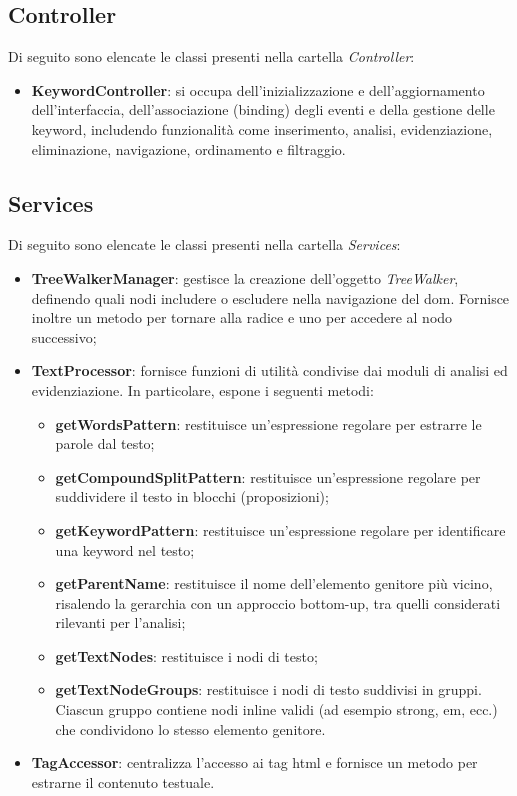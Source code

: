 \subsection{Controller}

\par Di seguito sono elencate le classi presenti nella cartella \textit{Controller}:

\begin{itemize}
  \item \textbf{KeywordController}: si occupa dell’inizializzazione e dell’aggiornamento dell’interfaccia, dell’associazione (binding) degli eventi e della gestione delle keyword, includendo funzionalità come inserimento, analisi, evidenziazione, eliminazione, navigazione, ordinamento e filtraggio.
\end{itemize}

\subsection{Services}

\par Di seguito sono elencate le classi presenti nella cartella \textit{Services}:

\begin{itemize}
  \item \textbf{TreeWalkerManager}: gestisce la creazione dell’oggetto \textit{TreeWalker}, definendo quali nodi includere o escludere nella navigazione del \gls{dom}. Fornisce inoltre un metodo per tornare alla radice e uno per accedere al nodo successivo;
  \item \textbf{TextProcessor}: fornisce funzioni di utilità condivise dai moduli di analisi ed evidenziazione. In particolare, espone i seguenti metodi:
  \begin{itemize}
    \item \textbf{getWordsPattern}: restituisce un'espressione regolare per estrarre le parole dal testo;
    \item \textbf{getCompoundSplitPattern}: restituisce un’espressione regolare per suddividere il testo in blocchi (proposizioni);
    \item \textbf{getKeywordPattern}: restituisce un’espressione regolare per identificare una keyword nel testo;
    \item \textbf{getParentName}: restituisce il nome dell’elemento genitore più vicino, risalendo la gerarchia con un approccio bottom-up, tra quelli considerati rilevanti per l’analisi;
    \item \textbf{getTextNodes}: restituisce i nodi di testo;
    \item \textbf{getTextNodeGroups}: restituisce i nodi di testo suddivisi in gruppi. Ciascun gruppo contiene nodi inline validi (ad esempio strong, em, ecc.) che condividono lo stesso elemento genitore.
  \end{itemize}
  \item \textbf{TagAccessor}: centralizza l’accesso ai tag \gls{html} e fornisce un metodo per estrarne il contenuto testuale.
\end{itemize}

